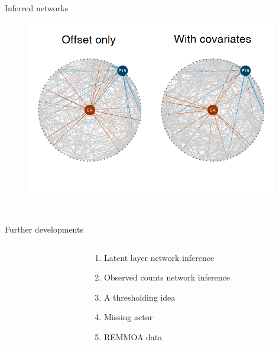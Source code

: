 \documentclass[9pt]{beamer}
\newcommand{\bleu}[1]{\textcolor{Framableulight}{#1}}
\begin{document}
\begin{frame}{Inferred networks}
\begin{figure}[htp]
\centering
\includegraphics[width=11cm]{compare_reseaux.png}

\end{figure}

\end{frame}
\section{}
\subsection{}
\begin{frame}{}
\begin{center}
\huge{\bleu{Further developments}} \bigskip
\end{center}
\begin{columns}
\begin{column}{3cm}
\end{column}
\begin{column}{10cm}
\Large{
\begin{enumerate}
	\item Latent layer network inference
	\item Observed counts network inference
	\item A thresholding idea
	\item Missing actor
	\item REMMOA data
\end{enumerate}}
\end{column}
\end{columns}
\end{frame}
\end{document}
